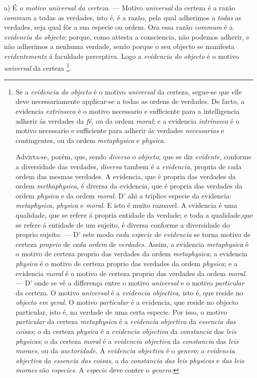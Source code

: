 a) É \emph{o motivo universal da certeza}. --- Motivo \emph{universal} da certeza é a razão \emph{commum} a todas as verdades, isto é, é a razão, pela qual adherimos a \emph{todas} as verdades, seja qual fôr a sua especie ou ordem. Ora essa razão \emph{commum} é a \emph{evidencia do objecto}; porque, como attesta a consciencia, não podemos adherir, e não adherimos a nenhuma verdade, senão porque o seu objecto se manifesta \emph{evidentemente} á faculdade perceptiva. Logo a \emph{evidencia do objecto} é o motivo \emph{universal} da certeza \footnote{Se a \emph{evidencia do objecto} é o motivo \emph{universal} da certeza, segue-se que elle deve necessariamente applicar-se a todas as ordens de verdades. De facto, a evidencia \emph{extrinseca} é o motivo necessario e sufficiente para a intelligencia adherir ás verdades da \emph{fé}, ou da ordem \emph{moral}; e a evidencia \emph{intrinseca} é o motivo necessario e sufficiente para adherir ás verdades \emph{necessarias} e contingentes, ou da ordem \emph{metaphysica} e \emph{physica}.\par Advirta-se, porém, que, sendo \emph{diverso} o \emph{objecto}, que se diz \emph{evidente}, conforme a diversidade das verdades, \emph{diversa} tambem é a \emph{evidencia}, propria de cada ordem das mesmas verdades. A evidencia, que é propria das verdades da ordem \emph{methaphysica}, é diversa da evidencia, que é propria das verdades da ordem \emph{physica} e da ordem \emph{moral}. D' ahi a triplice especie da evidencia: \emph{metaphysica}, \emph{physica} e \emph{moral}. E isto é muito razoavel. A evidencia é uma qualidade, que se refere á propria entidade da verdade; e toda a qualidade,que se refere á entidade de um sujeito, é diversa conforme a diversidade do proprio sujeito. --- D' este modo \emph{cada especie} de \emph{evidencia} se torna motivo de certeza \emph{proprio} de \emph{cada ordem} de \emph{verdades}. Assim, a evidencia \emph{metaphysica} é o motivo de certeza proprio das verdades da ordem \emph{metaphysica}; a evidencia \emph{physica} é o motivo de certeza proprio das verdades da ordem \emph{physica}; e a evidencia \emph{moral} é o motivo de certeza proprio das verdades da ordem \emph{moral}. --- D' onde se vê a differença entre o motivo \emph{universal} e o motivo \emph{particular} da certeza. O motivo \emph{universal} é a \emph{evidencia objectiva}, isto é, que reside no \emph{objecto em geral}. O motivo \emph{particular} é a evidencia, que reside no objecto particular, isto é, na verdade de uma certa especie. Por isso, o motivo \emph{particular} da certeza \emph{metaphysica} é a \emph{evidencia objectiva} da \emph{essencia das coisas}; o da certeza \emph{physica} é a \emph{evidencia objectiva} da \emph{constancia} das \emph{leis physicas}; o da certeza \emph{moral} é a \emph{evidencia objectiva} da \emph{constancia} das \emph{leis moraes}, ou da \emph{auctoridade}. A \emph{evidencia objectiva} é o \emph{genero}; a \emph{evidencia objectiva} da \emph{essencia das coisas}, a da \emph{constancia das leis physicas} e \emph{das leis moraes} são \emph{especies}. A \emph{especie} deve conter o \emph{genero}.}.

